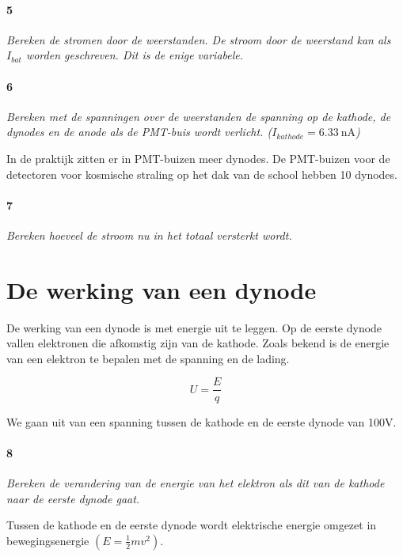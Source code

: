 \paragraph{5}

\textit{Bereken de stromen door de weerstanden. De stroom door de weerstand 
kan als $I_{bat}$ worden geschreven. Dit is de enige variabele.}

\paragraph{6}

\textit{Bereken met de spanningen over de weerstanden de spanning op de
kathode, de dynodes en de anode als de PMT-buis wordt verlicht.
($I_{kathode} = \SI{6.33}{\nano\ampere}$)}

In de praktijk zitten er in PMT-buizen meer dynodes. De PMT-buizen
voor de detectoren voor kosmische straling op het dak van de school
hebben 10 dynodes.

\paragraph{7}

\textit{Bereken hoeveel de stroom nu in het totaal versterkt wordt.}


\section{De werking van een dynode}

De werking van een dynode is met energie uit te leggen. Op de eerste
dynode vallen elektronen die afkomstig zijn van de kathode. Zoals
bekend is de energie van een elektron te bepalen met de spanning en
de lading.

\begin{equation}
    U = \frac{E}{q}
\end{equation}

We gaan uit van een spanning tussen de kathode en de eerste dynode van 100V.

\paragraph{8}

\textit{Bereken de verandering van de energie van het elektron als dit
van de kathode naar de eerste dynode gaat.}

Tussen de kathode en de eerste dynode wordt elektrische energie omgezet
in bewegingsenergie $\left(E=\frac{1}{2}mv^{2}\right)$.


